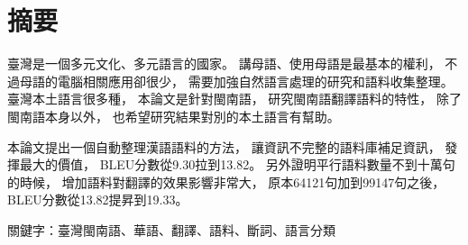 \chapter{摘要}
臺灣是一個多元文化、多元語言的國家。
講母語、使用母語是最基本的權利，
不過母語的電腦相關應用卻很少，
需要加強自然語言處理的研究和語料收集整理。
臺灣本土語言很多種，
本論文是針對閩南語，
研究閩南語翻譯語料的特性，
除了閩南語本身以外，
也希望研究結果對別的本土語言有幫助。

本論文提出一個自動整理漢語語料的方法，
讓資訊不完整的語料庫補足資訊，
發揮最大的價值，
BLEU分數從9.30拉到13.82。
另外證明平行語料數量不到十萬句的時候，
增加語料對翻譯的效果影響非常大，
原本64121句加到99147句之後，
BLEU分數從13.82提昇到19.33。

關鍵字：臺灣閩南語、華語、翻譯、語料、斷詞、語言分類
